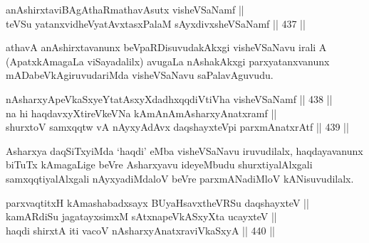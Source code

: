 
\begin{shl}
anAshirxtaviBAgAthaRmathavA\s sutx visheVSaNamf || \\
teVSu yatanxvidheVyatAvxtasxPalaM sAyxdivxsheVSaNamf \hfill || 437 ||  
\end{shl}

\begin{artha}
athavA anAshirxtavanunx beVpaRDisuvudakAkxgi visheVSaNavu irali A
(ApatxkAmagaLa viSayadalilx) avugaLa nAshakAkxgi parxyatanxvanunx
mADabeVkAgiruvudariMda visheVSaNavu saPalavAguvudu.
\end{artha}


\begin{shl}
nA\s \s sharxyApeVkaSxyeYtatAsxyXdadhxqqdiVtiVha visheVSaNamf \hfill || 438 ||  \\
na hi haqdavxyXtireVkeVNa kAmAnAmAsharxyAnatxramf || \\
shurxtoV samxqqtw vA nAyxyAdAvx daqshayxteV\s pi parxmAnatxrAtf \hfill || 439 ||  
\end{shl}

\begin{artha}
Asharxya daqSiTxyiMda `haqdi' eMba visheVSaNavu iruvudilalx, haqdayavanunx
biTuTx kAmagaLige beVre Asharxyavu ideyeMbudu shurxtiyalAlxgali
samxqqtiyalAlxgali nAyxyadiMdaloV beVre parxmANadiMloV kANisuvudilalx.
\end{artha}


\begin{shl}
parxvaqtitxH kAmashabadxsayx BUyaHsavxtheVRSu daqshayxteV || \\
kamARdiSu jagatayxsimxM sAtxnapeVkASxyXta ucayxteV || \\
haqdi shirxtA iti vacoV nA\s \s sharxyAnatxraviVkaSxyA \hfill || 440 ||  
\end{shl}

